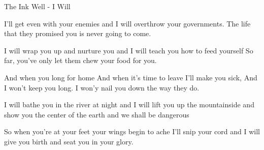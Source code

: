 The Ink Well - I Will

I'll get even with your enemies and
I will overthrow your governments.
The life that they promised you
is never going to come.

I will wrap you up and nurture you and
I will teach you how to feed yourself
So far, you've only let them
chew your food for you.

And when you long for home
And when it's time to leave
I'll make you sick,
And I won't keep you long.
I won'y nail you down the way they do.

I will bathe you in the river at night and
I will lift you up the mountainside 
and show you the center of the earth
and we shall be dangerous

So when you're at your feet
your wings begin to ache
I'll snip your cord
and I will give you birth
and seat you in your glory.